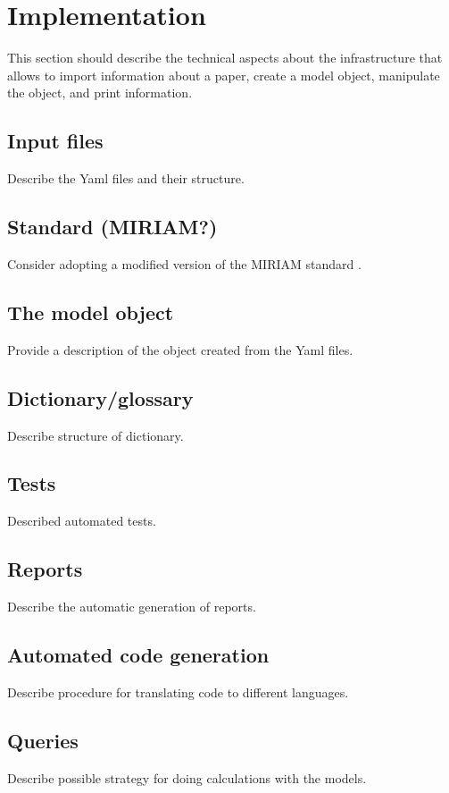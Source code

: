 \documentclass[11pt,a4paper]{article}
\begin{document}
%
\section{Implementation}
This section should describe the technical aspects about the infrastructure that allows to import information about a paper, create a model object, manipulate the object, and print information. 


\subsection{Input files}
Describe the Yaml files and their structure. 


\subsection{Standard (MIRIAM?)}
Consider adopting a modified version of the MIRIAM standard \citep{LeNovere2005CompBiol}. 

\subsection{The model object}
Provide a description of the object created from the Yaml files. 


\subsection{Dictionary/glossary}
Describe structure of dictionary.

\subsection{Tests}
Described automated tests.

\subsection{Reports}
Describe the automatic generation of reports. 


\subsection{Automated code generation}
Describe procedure for translating code to different languages.

\subsection{Queries}
Describe possible strategy for doing calculations with the models.
\end{document}
